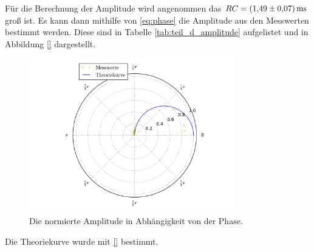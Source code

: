 Für die Berechnung der Amplitude wird angenommen das $RC=\SI{1.49\pm0.07}{\milli\second}$
groß ist. Es kann dann mithilfe von \eqref{eq:phase} die Amplitude aus den Messwerten bestimmt werden.
Diese sind in Tabelle \ref{tab:teil_d_amplitude} aufgelistet und in Abbildung \ref{} dargestellt.


\begin{figure}
  \includegraphics[width=0.8\textwidth]{pics/polarplot.pdf}
  \caption{Die normierte Amplitude in Abhängigkeit von der Phase.}
  \label{fig:plot_teil_d}
\end{figure}

Die Theoriekurve wurde mit \eqref{} bestimmt.
